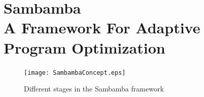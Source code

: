 \section[Sambamba - A Framework For Adaptive Program Optimization]{Sambamba \\ A Framework For Adaptive Program Optimization}
\begin{figure}
  \vspace*{-4mm}
  \centering
  \texttt{[image: SambambaConcept.eps]}
  \caption{Different stages in the Sambamba framework}
  \label{fig:SambambaConcept}
  \vspace{-4mm}
\end{figure}
